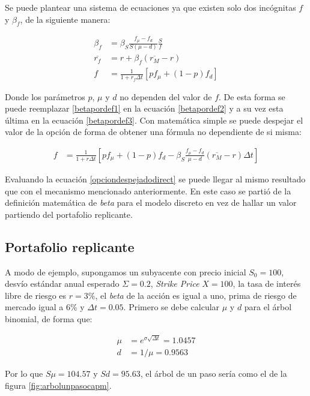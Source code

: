 Se puede plantear una sistema de ecuaciones ya que existen solo dos incógnitas $f$ y $\beta_f$, de la siguiente manera:

\begin{align}
	\beta_f &= \beta_S \frac{f_\mu - f_d}{S(\mu-d)} \frac{S}{f} \label{betapordef1} \\
	\overline{r_f} &= r + \beta_f (\overline{r_M} - r) \label{betapordef2} \\
	f &= \frac{1}{1+r_f \Delta t} \left[p f_\mu + (1-p) f_d \right] \label{betapordef3}
\end{align}

Donde los parámetros $p$, $\mu$ y $d$ no dependen del valor de $f$. De esta forma se puede reemplazar \eqref{betapordef1} en la ecuación \eqref{betapordef2} y a su vez esta última en la ecuación \eqref{betapordef3}. Con matemática simple se puede despejar el valor de la opción de forma de obtener una fórmula no dependiente de si misma:

\begin{align}
	f &= \frac{1}{1+r \Delta t} \left[p f_\mu + (1-p) f_d - 
		\beta_S \frac{f_\mu - f_d}{\mu-d} (\overline{r_M} - r) \Delta t \right] \label{opciondespejadodirect}
\end{align}

Evaluando la ecuación \eqref{opciondespejadodirect} se puede llegar al mismo resultado que con el mecanismo mencionado anteriormente. En este caso se partió de la definición matemática de \textit{beta} para el modelo discreto \cite{appliedderiv} en vez de hallar un valor partiendo del portafolio replicante. 

\subsection{Portafolio replicante}

A modo de ejemplo, supongamos un subyacente con precio inicial $S_0 = 100$, desvío estándar anual esperado $\Sigma = 0.2$, \textit{Strike Price} $X=100$, la tasa de interés libre de riesgo es $r=3\%$, el \textit{beta} de la acción es igual a uno, prima de riesgo de mercado igual a 6\% y $\Delta t = 0.05$. Primero se debe calcular $\mu$ y $d$ para el árbol binomial, de forma que:

\begin{align}
	\mu &= e^{\sigma \sqrt{\Delta t}} = 1.0457\\
	d &= 1/\mu = 0.9563
\end{align}

Por lo que $S \mu = 104.57$ y $S d = 95.63$, el árbol de un paso sería como el de la figura \ref{fig:arbolunpasocapm}.

